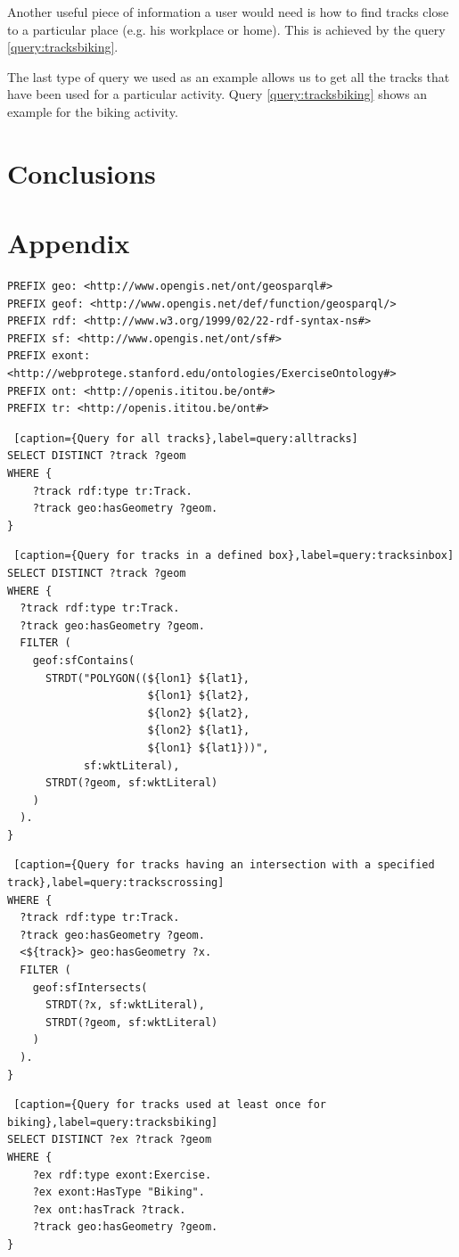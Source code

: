\documentclass[11pt,a4paper]{scrreprt}
\begin{document}
Another useful piece of information a user would need is how to find tracks close to a particular place (e.g. his workplace or home). This is achieved by the query \ref{query:tracksbiking}.

The last type of query we used as an example allows us to get all the tracks that have been used for a particular activity. Query \ref{query:tracksbiking} shows an example for the biking activity.





\chapter{Conclusions}
\chapter*{Appendix}
\begin{lstlisting}[caption={Prefixes used in the hereinbelow queries},label=query:prefixes]
PREFIX geo: <http://www.opengis.net/ont/geosparql#>
PREFIX geof: <http://www.opengis.net/def/function/geosparql/>
PREFIX rdf: <http://www.w3.org/1999/02/22-rdf-syntax-ns#>
PREFIX sf: <http://www.opengis.net/ont/sf#>
PREFIX exont: <http://webprotege.stanford.edu/ontologies/ExerciseOntology#>
PREFIX ont: <http://openis.ititou.be/ont#>
PREFIX tr: <http://openis.ititou.be/ont#>
\end{lstlisting}
\begin{lstlisting} [caption={Query for all tracks},label=query:alltracks]
SELECT DISTINCT ?track ?geom
WHERE {
    ?track rdf:type tr:Track.
    ?track geo:hasGeometry ?geom.
}
\end{lstlisting}

\begin{lstlisting} [caption={Query for tracks in a defined box},label=query:tracksinbox]
SELECT DISTINCT ?track ?geom
WHERE {
  ?track rdf:type tr:Track.
  ?track geo:hasGeometry ?geom.
  FILTER (
    geof:sfContains(
      STRDT("POLYGON((${lon1} ${lat1}, 
      				  ${lon1} ${lat2}, 
      				  ${lon2} ${lat2}, 
      				  ${lon2} ${lat1}, 
      				  ${lon1} ${lat1}))", 
      	    sf:wktLiteral),
      STRDT(?geom, sf:wktLiteral)
    )
  ).
}
\end{lstlisting}

\begin{lstlisting} [caption={Query for tracks having an intersection with a specified track},label=query:trackscrossing]
WHERE {
  ?track rdf:type tr:Track.
  ?track geo:hasGeometry ?geom.
  <${track}> geo:hasGeometry ?x.
  FILTER (
    geof:sfIntersects(
      STRDT(?x, sf:wktLiteral),
      STRDT(?geom, sf:wktLiteral)
    )
  ).
}
\end{lstlisting}
\pagebreak
\begin{lstlisting} [caption={Query for tracks used at least once for biking},label=query:tracksbiking]
SELECT DISTINCT ?ex ?track ?geom
WHERE {
    ?ex rdf:type exont:Exercise.
    ?ex exont:HasType "Biking".
    ?ex ont:hasTrack ?track.
    ?track geo:hasGeometry ?geom.
}
\end{lstlisting}
\end{document}
